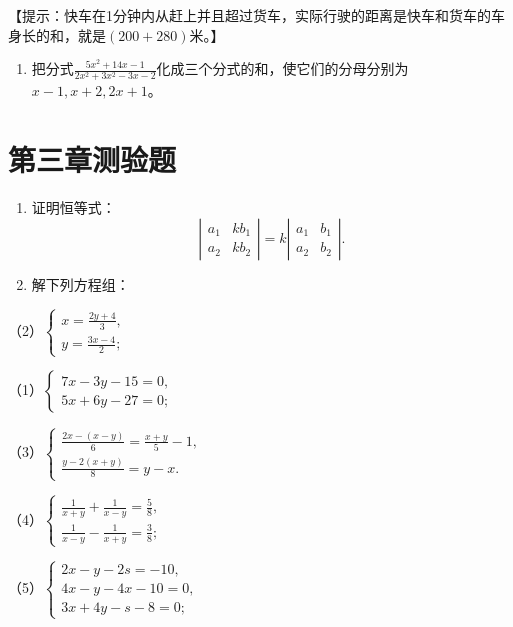 【提示：快车在1分钟内从赶上并且超过货车，实际行驶的距离是快车和货车的车身长的和，就是\((200 + 280)\)米。】

\begin{enumerate}[start=12]
\item
  把分式\(\frac{5x^2 + 14x - 1}{2x^2 + 3x^2 - 3x - 2}\)化成三个分式的和，使它们的分母分别为\(x - 1, x + 2, 2x + 1\)。
\end{enumerate}

\section{第三章测验题}

\begin{enumerate}
\item
  证明恒等式：
\[
\left| \begin{array}{ll} a _ {1} & k b _ {1} \\ a _ {2} & k b _ {2} \end{array} \right| = k \left| \begin{array}{ll} a _ {1} & b _ {1} \\ a _ {2} & b _ {2} \end{array} \right|.
\]
\item
  解下列方程组：
\end{enumerate}

（2）\(\left\{ \begin{array}{l} x = \frac{2y + 4}{3}, \\ y = \frac{3x - 4}{2}; \end{array} \right.\)

（1）\(\left\{ \begin{array}{l} 7x - 3y - 15 = 0, \\ 5x + 6y - 27 = 0; \end{array} \right.\)

（3）\(\left\{ \begin{array}{l} \frac{2x - (x - y)}{6} = \frac{x + y}{5} - 1, \\ \frac{y - 2(x + y)}{8} = y - x. \end{array} \right.\)

（4）\(\left\{ \begin{array}{l} \frac{1}{x + y} + \frac{1}{x - y} = \frac{5}{8}, \\ \frac{1}{x - y} - \frac{1}{x + y} = \frac{3}{8}; \end{array} \right.\)

（5）\(\left\{ \begin{array}{l} 2x - y - 2s = -10, \\ 4x - y - 4x - 10 = 0, \\ 3x + 4y - s - 8 = 0; \end{array} \right.\)

